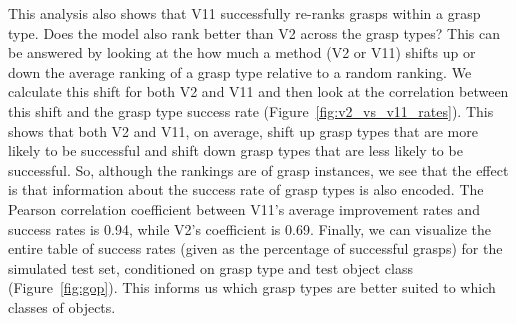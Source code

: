 This analysis also shows that V11 successfully re-ranks grasps within a grasp type. Does the model also rank better than V2 across the grasp types? This can be answered by looking at the how much a method (V2 or V11) shifts up or down the average ranking of a grasp type relative to a random ranking. We calculate this shift for both V2 and V11 and then look at the correlation between this shift and the grasp type success rate (Figure~\ref{fig:v2_vs_v11_rates}). This shows that both V2 and V11, on average, shift up grasp types that are more likely to be successful and shift down grasp types that are less likely to be successful. So, although the rankings are of grasp instances, we see that the effect is that information about the success rate of grasp types is also encoded. The Pearson correlation coefficient between V11's average improvement rates and success rates is 0.94, while V2's coefficient is 0.69. Finally, we can visualize the entire table of success rates (given as the percentage of successful grasps) for the simulated test set, conditioned on grasp type and test object class (Figure~\ref{fig:gop}). This informs us which grasp types are better suited to which classes of objects.



